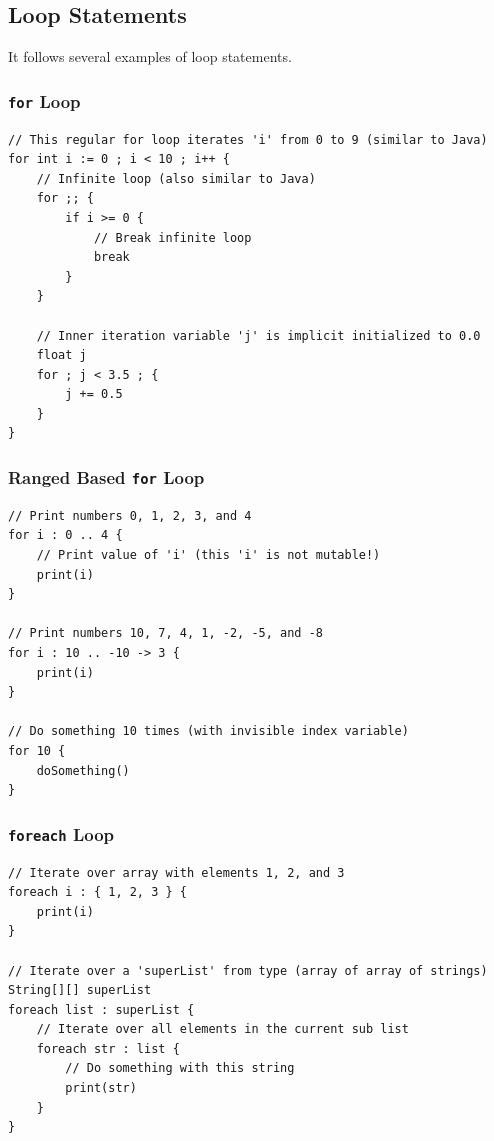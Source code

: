 \documentclass{report}
\begin{document}
\subsection{Loop Statements}

It follows several examples of loop statements.

\subsubsection{\texttt{for} Loop}

\begin{lstlisting}
// This regular for loop iterates 'i' from 0 to 9 (similar to Java)
for int i := 0 ; i < 10 ; i++ {
    // Infinite loop (also similar to Java)
    for ;; {
        if i >= 0 {
            // Break infinite loop
            break
        }
    }
    
    // Inner iteration variable 'j' is implicit initialized to 0.0
    float j
    for ; j < 3.5 ; {
        j += 0.5
    }
}
\end{lstlisting}

\subsubsection{Ranged Based \texttt{for} Loop}

\begin{lstlisting}
// Print numbers 0, 1, 2, 3, and 4
for i : 0 .. 4 {
    // Print value of 'i' (this 'i' is not mutable!)
    print(i)
}

// Print numbers 10, 7, 4, 1, -2, -5, and -8
for i : 10 .. -10 -> 3 {
    print(i)
}

// Do something 10 times (with invisible index variable)
for 10 {
    doSomething()
}
\end{lstlisting}

\subsubsection{\texttt{foreach} Loop}

\begin{lstlisting}
// Iterate over array with elements 1, 2, and 3
foreach i : { 1, 2, 3 } {
    print(i)
}

// Iterate over a 'superList' from type (array of array of strings)
String[][] superList
foreach list : superList {
    // Iterate over all elements in the current sub list
    foreach str : list {
        // Do something with this string
        print(str)
    }
}
\end{lstlisting}
\end{document}
